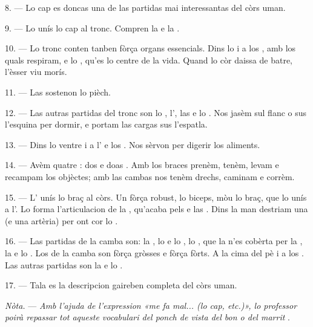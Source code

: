 8. --- Lo cap es doncas una de las partidas mai interessantas del còrs uman.

\VUsaut{4.4mm}
\VUsaut{3.0mm}

9. --- Lo  unís lo cap al tronc. Compren la  e la
.

10. --- Lo tronc conten tanben fòrça organs essencials. Dins lo  i a
los , amb los quals respiram, e lo , qu'es lo centre
de la vida. Quand lo còr daissa de batre, l'èsser viu morís.

11. --- Las  sostenon lo pièch.

12. --- Las autras partidas del tronc son lo , l',
las  e lo . Nos jasèm sul flanc o sus l'esquina
per dormir, e portam las cargas sus l'espatla.

13. --- Dins lo ventre i a l' e los . Nos sèrvon
per digerir los aliments.

\VUsaut{4.4mm}
\VUsaut{3.0mm}

14. --- Avèm quatre : dos  e doas .
Amb los braces prenèm, tenèm, levam e recampam los objèctes; amb las cambas nos
tenèm drechs, caminam e corrèm.

15. --- L' unís lo braç al còrs. Un  fòrça robust,
lo biceps, mòu lo braç, que lo  unís a l'. Lo
 forma l'articulacion de la , qu'acaba pels
 e las . Dins la man destriam una  (e una
artèria) per ont cor lo .

16. --- Las partidas de la camba son: la , lo  e lo
, lo , que la  n'es cobèrta
per la , la  e lo . Los  de
la camba son fòrça gròsses e fòrça fòrts. A la cima del pè i a los . Las autras partidas son la  e lo .

17. --- Tala es la descripcion gaireben completa del còrs uman.

\textit{Nòta.} --- \textit{Amb l'ajuda de l'expression «me fa mal... (lo cap,
etc.)», lo professor poirà repassar tot aqueste vocabulari del ponch de vista del
bon o del marrit} .

